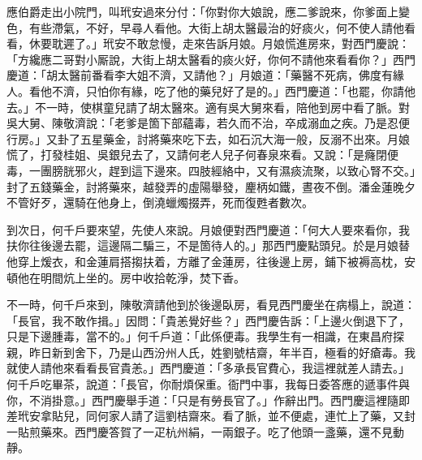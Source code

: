 應伯爵走出小院門，叫玳安過來分付：「你對你大娘說，應二爹說來，你爹面上變色，有些滯氣，不好，早尋人看他。大街上胡太醫最治的好痰火，{}何不使人請他看看，休要耽遲了。」玳安不敢怠慢，走來告訴月娘。月娘慌進房來，對西門慶說：「方纔應二哥對小厮說，大街上胡太醫看的痰火好，你何不請他來看看你？」西門慶道：「胡太醫前番看李大姐不濟，又請他？」月娘道：「藥醫不死病，佛度有緣人。看他不濟，只怕你有緣，吃了他的藥兒好了是的。」{}西門慶道：「也罷，你請他去。」不一時，使棋童兒請了胡太醫來。適有吳大舅來看，陪他到房中看了脈。對吳大舅、陳敬濟說：「老爹是箇下部蘊毒，若久而不治，卒成溺血之疾。乃是忍便行房。」又卦了五星藥金，討將藥來吃下去，如石沉大海一般，反溺不出來。月娘慌了，打發桂姐、吳銀兒去了，又請何老人兒子何春泉來看。又說：「是癃閉便毒，一團膀胱邪火，趕到這下邊來。四肢經絡中，又有濕痰流聚，以致心腎不交。」{}封了五錢藥金，討將藥來，越發弄的虛陽舉發，麈柄如鐵，晝夜不倒。潘金蓮晚夕不管好歹，還騎在他身上，倒澆蠟燭掇弄，死而復甦者數次。{}

到次日，何千戶要來望，先使人來說。月娘便對西門慶道：「何大人要來看你，我扶你往後邊去罷，{}這邊隔二騙三，不是箇待人的。」那西門慶點頭兒。於是月娘替他穿上煖衣，和金蓮肩搭搊扶着，方離了金蓮房，往後邊上房，鋪下被褥高枕，安頓他在明間炕上坐的。房中收拾乾淨，焚下香。

不一時，何千戶來到，陳敬濟請他到於後邊臥房，看見西門慶坐在病榻上，說道：「長官，我不敢作揖。」因問：「貴恙覺好些？」西門慶告訴：「上邊火倒退下了，只是下邊腫毒，當不的。」何千戶道：「此係便毒。我學生有一相識，在東昌府探親，昨日新到舍下，乃是山西汾州人氏，姓劉號桔齋，年半百，極看的好瘡毒。我就使人請他來看看長官貴恙。」西門慶道：「多承長官費心，我這裡就差人請去。」何千戶吃畢茶，說道：「長官，你耐煩保重。衙門中事，我每日委答應的遞事件與你，不消掛意。」西門慶舉手道：「只是有勞長官了。」作辭出門。西門慶這裡隨即差玳安拿貼兒，同何家人請了這劉桔齋來。看了脈，並不便處，連忙上了藥，又封一貼煎藥來。西門慶答賀了一疋杭州絹，一兩銀子。吃了他頭一盞藥，還不見動靜。

